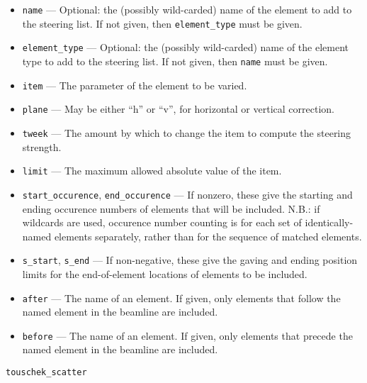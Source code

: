 \documentclass[11pt]{article}
\begin{document}
\begin{itemize}
\item \verb|name| --- Optional: the (possibly wild-carded) name of the element to add to the steering list.
        If not given, then \verb|element_type| must be given.
\item \verb|element_type| --- Optional: the (possibly wild-carded) name of the element type to add to the
        steering list.  If not given, then \verb|name| must be given.
\item \verb|item| --- The parameter of the element to be varied.
\item \verb|plane| --- May be either ``h'' or ``v'', for horizontal or vertical correction.
\item \verb|tweek| --- The amount by which to change the item to compute the steering strength.
\item \verb|limit| --- The maximum allowed absolute value of the item.
\item \verb|start_occurence|, \verb|end_occurence| --- If nonzero, these give the starting and
 ending occurence numbers of elements that will be included. N.B.: if wildcards are used, occurence
 number counting is for each set of identically-named elements separately, rather than for the sequence
 of matched elements.
\item \verb|s_start|, \verb|s_end| --- If non-negative, these give the gaving and ending position
 limits for the end-of-element locations of elements to be included.
\item \verb|after| --- The name of an element.  If given, only elements
 that follow the named element in the beamline are included.  
\item \verb|before| --- The name of an element. If given, only elements
 that precede the named element in the beamline are included.  
\end{itemize}

\newpage
\begin{center}{\Large\verb|touschek_scatter|}\end{center}
\end{document}

